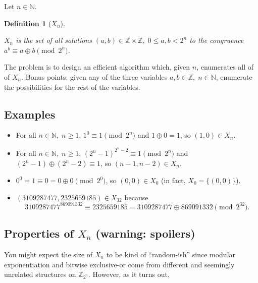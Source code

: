 \documentclass[1gpt]{article}
\theoremstyle{break}
\newtheorem{definition}[theorem]{Definition}
\theoremstyle{nonumberbreak}
\newenvironment{Def}[2]{\begin{definition}[#1]\label{Def:#2}}{\end{definition}}
\newcommand{\NN}{\mathbb{N}}
\newcommand{\ZZ}{\mathbb{Z}}
\newcommand{\xor}{\oplus}
\begin{document}
Let $n \in \NN$.

\begin{Def}{$X_n$}{xn}

    $X_n$ is the set of all solutions $(a, b) \in \ZZ \times \ZZ,\; 0 \leq a,b < 2^n$ to the congruence $a^b \equiv a \xor b \pmod{2^n}$.

\end{Def}

The problem is to design an efficient algorithm which, given $n$, enumerates all of of $X_n$. Bonus points: given any of the three variables $a, b \in \ZZ,\; n \in \NN$, enumerate the possibilities for the rest of the variables.

\subsection{Examples}

\begin{itemize}

    \item

        For all $n \in \NN,\; n \geq 1$, $1^0 \equiv 1 \pmod{2^n}$ and $1 \xor 0 = 1$, so $(1, 0) \in X_n$.

    \item

        For all $n \in \NN,\; n \geq 1$, $(2^n-1)^{2^n-2} \equiv 1 \pmod{2^n}$ and $(2^n-1) \xor (2^n-2) \equiv 1$, so $(n-1, n-2) \in X_n$.

    \item

        $0^0 = 1 \equiv 0 = 0 \xor 0 \pmod{2^0}$, so $(0, 0) \in X_0$ (in fact, $X_0 = \{(0, 0)\}$).

    \item

        $(3109287477, 2325659185) \in X_{32}$ because $$3109287477^{869091332} \equiv 2325659185 = 3109287477 \xor 869091332 \pmod{2^{32}}.$$

\end{itemize}

\subsection{Properties of \texorpdfstring{$X_n$}{Xn} (warning: spoilers)}

You might expect the size of $X_n$ to be kind of ``random-ish'' since modular exponentiation and bitwise exclusive-or come from different and seemingly unrelated structures on $\mathbb{Z}_{2^n}$. However, as it turns out,
\end{document}
